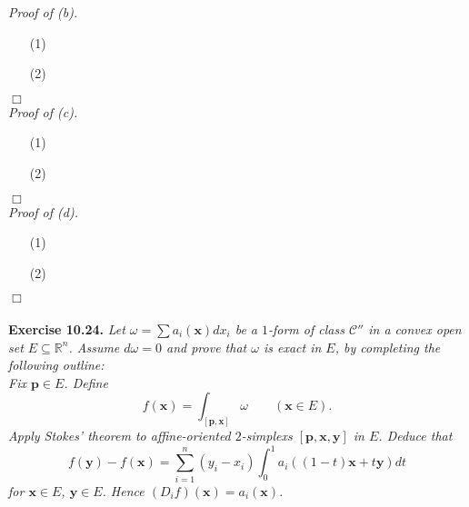 \documentclass{article}
\begin{document}
\emph{Proof of (b).}
\begin{enumerate}
\item[(1)]
\item[(2)]

\end{enumerate}
$\Box$ \\



\emph{Proof of (c).}
\begin{enumerate}
\item[(1)]
\item[(2)]

\end{enumerate}
$\Box$ \\



\emph{Proof of (d).}
\begin{enumerate}
\item[(1)]
\item[(2)]

\end{enumerate}
$\Box$ \\\\






\textbf{Exercise 10.24.}
\emph{Let $\omega = \sum a_i(\mathbf{x}) dx_i$ be a $1$-form of class $\mathscr{C}''$
in a convex open set $E \subseteq \mathbb{R}^n$.
Assume $d\omega = 0$ and prove that $\omega$ is exact in $E$,
by completing the following outline:} \\

\emph{Fix $\mathbf{p} \in E$.
Define
\[
  f(\mathbf{x}) = \int_{[\mathbf{p},\mathbf{x}]} \omega
  \qquad
  (\mathbf{x} \in E).
\]
Apply Stokes' theorem to affine-oriented $2$-simplexs $[\mathbf{p},\mathbf{x},\mathbf{y}]$ in $E$.
Deduce that
\[
  f(\mathbf{y}) - f(\mathbf{x})
  = \sum_{i=1}^{n}(y_i - x_i) \int_{0}^{1} a_i((1-t)\mathbf{x} + t\mathbf{y}) dt
\]
for $\mathbf{x} \in E$, $\mathbf{y} \in E$.
Hence $(D_i f)(\mathbf{x}) = a_i(\mathbf{x})$.} \\
\end{document}
